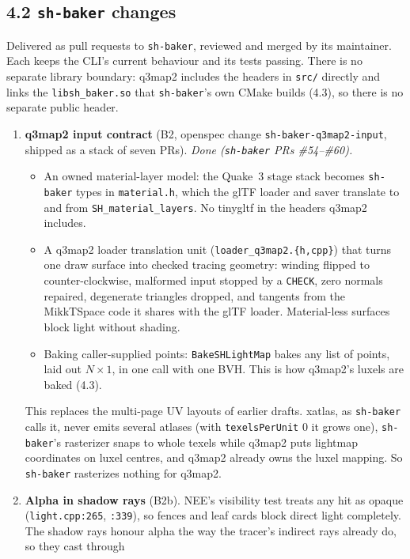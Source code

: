 \documentclass[11pt,a4paper]{article}
\begin{document}
\subsection{4.2 \texttt{sh-baker} changes}

Delivered as pull requests to \texttt{sh-baker}, reviewed and merged by its maintainer. Each keeps
the CLI's current behaviour and its tests passing. There is no separate library boundary:
q3map2 includes the headers in \texttt{src/} directly and links the \texttt{libsh\_baker.so} that
\texttt{sh-baker}'s own CMake builds (4.3), so there is no separate public header.
\begin{enumerate}
\item \textbf{q3map2 input contract} (B2, openspec change \texttt{sh-baker-q3map2-input}, shipped as
  a stack of seven PRs). \emph{Done (\texttt{sh-baker} PRs \#54--\#60).}
  \begin{itemize}
  \item An owned material-layer model: the Quake~3 stage stack becomes \texttt{sh-baker} types in
    \texttt{material.h}, which the glTF loader and saver translate to and from
    \texttt{SH\_material\_layers}. No tinygltf in the headers q3map2 includes.
  \item A q3map2 loader translation unit (\texttt{loader\_q3map2.\{h,cpp\}}) that turns one draw
    surface into checked tracing geometry: winding flipped to counter-clockwise, malformed input
    stopped by a \texttt{CHECK}, zero normals repaired, degenerate triangles dropped, and tangents
    from the MikkTSpace code it shares with the glTF loader. Material-less surfaces block light
    without shading.
  \item Baking caller-supplied points: \texttt{BakeSHLightMap} bakes any list of points, laid out
    $N\times1$, in one call with one BVH. This is how q3map2's luxels are baked (4.3).
  \end{itemize}
  This replaces the multi-page UV layouts of earlier drafts. xatlas, as \texttt{sh-baker} calls it,
  never emits several atlases (with \texttt{texelsPerUnit} 0 it grows one), \texttt{sh-baker}'s
  rasterizer snaps to whole texels while q3map2 puts lightmap coordinates on luxel centres, and
  q3map2 already owns the luxel mapping. So \texttt{sh-baker} rasterizes nothing for q3map2.
\item \textbf{Alpha in shadow rays} (B2b). NEE's visibility test treats any hit as opaque
  (\texttt{light.cpp:265}, \texttt{:339}), so fences and leaf cards block direct light completely.
  The shadow rays honour alpha the way the tracer's indirect rays already do, so they cast through

\end{enumerate}
\end{document}

